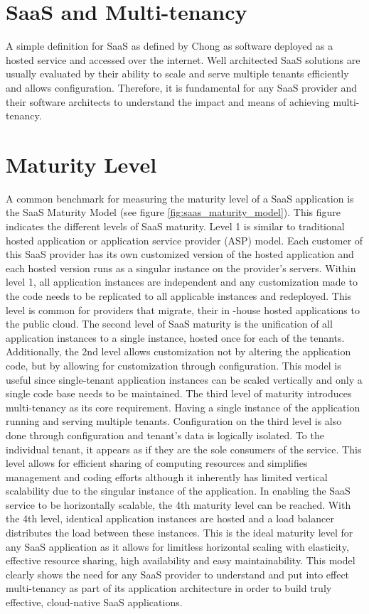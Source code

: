 \section{SaaS and Multi-tenancy}

A simple definition for SaaS as defined by Chong \cite{Chong2006} as software deployed as a hosted service and accessed over the internet. Well architected SaaS solutions are usually evaluated by their ability to scale and serve multiple tenants efficiently and allows configuration. Therefore, it is fundamental for any SaaS provider and their software architects to understand the impact and means of achieving multi-tenancy.

\section{Maturity Level}

A common benchmark for measuring the maturity level of a SaaS application is the SaaS Maturity Model (see figure \ref{fig:saas_maturity_model}). This figure indicates the different levels of SaaS maturity. Level 1 is similar to traditional hosted application or application service provider (ASP) model. Each customer of this SaaS provider has its own customized version of the hosted application and each hosted version runs as a singular instance on the provider's servers. Within level 1, all application instances are independent and any customization made to the code needs to be replicated to all applicable instances and redeployed. This level is common for providers that migrate, their in -house hosted applications to the public cloud. The second level of SaaS maturity is the unification of all application instances to a single instance, hosted once for each of the tenants. Additionally, the 2nd level allows customization not by altering the application code, but by allowing for customization through configuration. This model is useful since single-tenant application instances can be scaled vertically and only a single code base needs to be maintained. The third level of maturity introduces multi-tenancy as its core requirement. Having a single instance of the application running and serving multiple tenants. Configuration on the third level is also done through configuration and tenant's data is logically isolated. To the individual tenant, it appears as if they are the sole consumers of the service. This level allows for efficient sharing of computing resources and simplifies management and coding efforts although it inherently has limited vertical scalability due to the singular instance of the application. In enabling the SaaS service to be horizontally scalable, the 4th maturity level can be reached. With the 4th level, identical application instances are hosted and a load balancer distributes the load between these instances. This is the ideal maturity level for any SaaS application as it allows for limitless horizontal scaling with elasticity, effective resource sharing, high availability  and easy maintainability. This model clearly shows the need for any SaaS provider to understand and put into effect multi-tenancy as part of its application architecture in order to build truly effective, cloud-native SaaS applications.

